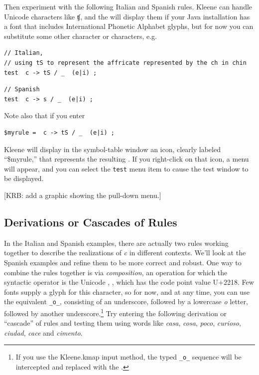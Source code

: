 Then experiment with the following Italian and Spanish rules.  Kleene can handle Unicode characters
like ʧ, and the  will display them if your Java installation has a font
that includes International Phonetic Alphabet glyphs, but for now you can substitute some other character or characters, e.g.


\begin{Verbatim}
// Italian, 
// using tS to represent the affricate represented by the ch in chin
test  c -> tS / _  (e|i) ;
\end{Verbatim}

\begin{Verbatim}
// Spanish
test  c -> s / _  (e|i) ;
\end{Verbatim}


\noindent
Note also that if you enter

\begin{Verbatim}
$myrule =  c -> tS / _  (e|i) ;
\end{Verbatim}

\noindent
Kleene will display in the symbol-table window an icon, clearly labeled ``\$myrule,'' that represents the resulting
\fst{}.  If you right-click on that icon, a menu will appear, and you can select the \texttt{test} menu item to
cause the test window to be displayed.

[KRB:  add a graphic showing the pull-down menu.]

\subsection{Derivations or Cascades of Rules}

In the Italian and Spanish examples, there are actually two rules working together to describe the realizations of
\emph{c} in different contexts.  We'll look at the Spanish examples and refine them to be more correct and robust.  One
way to combine the rules together is via \emph{composition}, an
operation for which the syntactic 
operator is the Unicode , \ringop{}, which
has the code point value U+2218.  Few fonts supply a glyph for this
character, so for now, and at any time, you can use
the  equivalent \verb!_o_!, consisting of an
underscore, followed by a lowercase \emph{o} letter, followed by another underscore.\footnote{If you use the
Kleene.kmap input method, the typed \verb!_o_! sequence will be
intercepted and replaced with the  \ringop{}.}
Try entering the following derivation or ``cascade'' of rules and testing them using words like \emph{casa},
\emph{cosa}, \emph{poco}, \emph{curioso}, \emph{ciudad}, \emph{cace} and \emph{cimento}.


